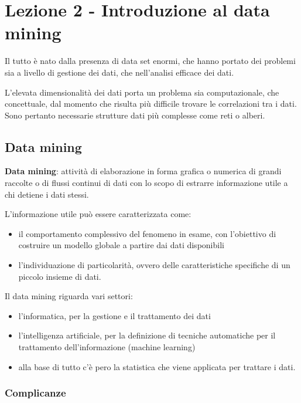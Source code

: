 \chapter{Lezione 2 - Introduzione al data
mining}\label{lezione-2---introduzione-al-data-mining}

Il tutto è nato dalla presenza di data set enormi, che hanno portato dei
problemi sia a livello di gestione dei dati, che nell'analisi efficace
dei dati.

L'elevata dimensionalità dei dati porta un problema sia computazionale,
che concettuale, dal momento che risulta più difficile trovare le
correlazioni tra i dati. Sono pertanto necessarie strutture dati più
complesse come reti o alberi.

\section{Data mining}\label{data-mining}

\textbf{Data mining}: attività di elaborazione in forma grafica o
numerica di grandi raccolte o di flussi continui di dati con lo scopo di
estrarre informazione utile a chi detiene i dati stessi.

L'informazione utile può essere caratterizzata come:

\begin{itemize}
\item
  il comportamento complessivo del fenomeno in esame, con l'obiettivo di
  costruire un modello globale a partire dai dati disponibili
\item
  l'individuazione di particolarità, ovvero delle caratteristiche
  specifiche di un piccolo insieme di dati.
\end{itemize}

Il data mining riguarda vari settori:

\begin{itemize}
\item
  l'informatica, per la gestione e il trattamento dei dati
\item
  l'intelligenza artificiale, per la definizione di tecniche automatiche
  per il trattamento dell'informazione (machine learning)
\item
  alla base di tutto c'è pero la statistica che viene applicata per
  trattare i dati.
\end{itemize}

\subsection{Complicanze}\label{complicanze}

